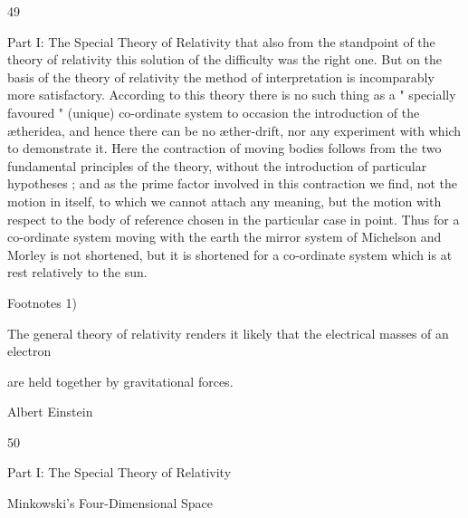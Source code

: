 \documentclass{article}
\begin{document}
49

Part I: The Special Theory of Relativity
that also from the standpoint of the theory of relativity this solution of the difficulty was the
right one. But on the basis of the theory of relativity the method of interpretation is
incomparably more satisfactory. According to this theory there is no such thing as a "
specially favoured " (unique) co-ordinate system to occasion the introduction of the ætheridea, and hence there can be no æther-drift, nor any experiment with which to demonstrate
it. Here the contraction of moving bodies follows from the two fundamental principles of
the theory, without the introduction of particular hypotheses ; and as the prime factor
involved in this contraction we find, not the motion in itself, to which we cannot attach any
meaning, but the motion with respect to the body of reference chosen in the particular case
in point. Thus for a co-ordinate system moving with the earth the mirror system of
Michelson and Morley is not shortened, but it is shortened for a co-ordinate system which is
at rest relatively to the sun.

Footnotes
1)

The general theory of relativity renders it likely that the electrical masses of an electron

are held together by gravitational forces.

Albert Einstein

50

Part I: The Special Theory of Relativity

Minkowski's Four-Dimensional
Space
\end{document}
